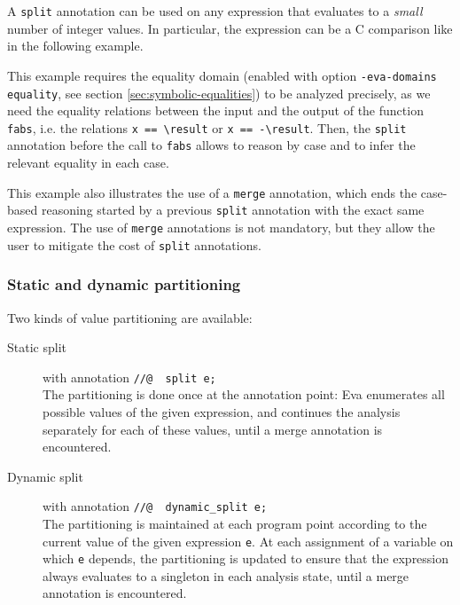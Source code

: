 \documentclass{frama-c-book}
\begin{document}

A \lstinline|split| annotation can be used on any expression that evaluates to a
{\it small} number of integer values. In particular, the expression can be a C
comparison like in the following example.


This example requires the equality domain (enabled with option
\lstinline|-eva-domains equality|, see section \ref{sec:symbolic-equalities}) to
be analyzed precisely, as we need the equality relations between the input and
the output of the function \lstinline|fabs|, i.e. the relations
\lstinline|x == \result| or \lstinline|x == -\result|.
Then, the \lstinline|split| annotation before the call to \lstinline|fabs|
allows \Eva{} to reason by case and to infer the relevant equality in each case.

This example also illustrates the use of a \lstinline|merge| annotation, which
ends the case-based reasoning started by a previous \lstinline|split| annotation
with the exact same expression.
The use of \lstinline|merge| annotations is not mandatory, but they allow the
user to mitigate the cost of \lstinline|split| annotations.

\subsubsection{Static and dynamic partitioning}

Two kinds of value partitioning are available:
\begin{description}
\item[Static split] with annotation \lstinline|//@  split e;| \\
  The partitioning is done once at the annotation point: Eva enumerates all
  possible values of the given expression, and continues the analysis separately
  for each of these values, until a merge annotation is encountered.
\item[Dynamic split] with annotation \lstinline|//@  dynamic_split e;| \\
  The partitioning is maintained at each program point according to the current
  value of the given expression \lstinline|e|. At each assignment of a variable
  on which \lstinline|e| depends, the partitioning is updated to ensure that the
  expression always evaluates to a singleton in each analysis state, until a
  merge annotation is encountered.
\end{description}
\end{document}
